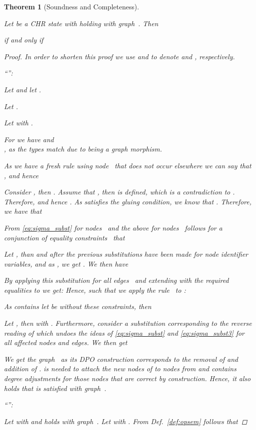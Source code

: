 \documentclass{tlp}
\newtheorem{theorem}{Theorem}\newtheorem{corollary}[theorem]{Corollary}
\begin{document}
\begin{theorem}[Soundness and Completeness]\label{thm:sound_and_complete}

Let  be a CHR state with
 holding with graph~. Then 
\centerline{if and only if}


\begin{proof}

In order to shorten this proof we use  and  to denote 
and , respectively.

``'':

Let  and let .

Let .

Let  with .

For  we have  and\\
, as the types match due to
 being a graph morphism.

As we have a fresh rule using node~ that does not occur elsewhere we can say
that , and hence


Consider , then . Assume that , then 
is defined, which is a contradiction to . Therefore,  and hence . As
 satisfies the gluing condition, we know 
that . Therefore, we have that


From \eqref{eq:sigma_subst} for nodes~ and the above for nodes~ follows for a conjunction of equality constraints~ that 

Let , than 
and after the previous substitutions have been made for node identifier
variables, and as , we get
 . We then have


By applying this substitution for all edges~ and extending  with
the required equalities to  we get:  Hence,  such that we apply the rule~ to
: 

As  contains  let  be
 without these constraints, then


Let , then  with . Furthermore, consider  a substitution corresponding to the reverse
reading of  which undoes the ideas of \eqref{eq:sigma_subst} and
\eqref{eq:sigma_subst3} for all affected nodes and edges. We then get



We get the graph~ as its DPO construction corresponds to the removal of  and addition of .  is needed to attach the
new nodes of  to nodes from  and  contains degree
adjustments for those nodes that are correct by construction. Hence, it also
holds that  is satisfied with graph~.

\vskip1cm
``'':

Let  with  and
 holds with graph~. Let  with . From Def.~\ref{def:opsem}
follows that



\end{proof}
\end{theorem}
\end{document}

